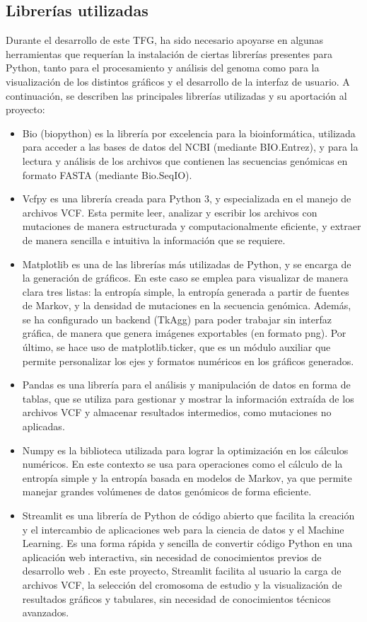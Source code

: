 \documentclass[11pt,spanish,listoffigures,listoftables]{tfgetsinf}
\begin{document}
\subsection{Librerías utilizadas}

Durante el desarrollo de este \acs{TFG}, ha sido necesario apoyarse en algunas herramientas que requerían la instalación de ciertas librerías presentes para Python, tanto para el procesamiento y análisis del genoma como para la visualización de los distintos gráficos y el desarrollo de la interfaz de usuario. A continuación, se describen las principales librerías utilizadas y su aportación al proyecto:

\begin{itemize}
   \item Bio (biopython) es la librería por excelencia para la bioinformática, utilizada para acceder a las bases de datos del \acs{NCBI} (mediante BIO.Entrez), y para la lectura y análisis de los archivos que contienen las secuencias genómicas en formato \acs{FASTA} (mediante Bio.SeqIO).
   \item Vcfpy es una librería creada para Python 3, y especializada en el manejo de archivos \acs{VCF}. Esta permite leer, analizar y escribir los archivos con mutaciones de manera estructurada y computacionalmente eficiente, y extraer de manera sencilla e intuitiva la información que se requiere.
   \item Matplotlib es una de las librerías más utilizadas de Python, y se encarga de la generación de gráficos. En este caso se emplea para visualizar de manera clara tres listas: la entropía simple, la entropía generada a partir de fuentes de Markov, y la densidad de mutaciones en la secuencia genómica. Además, se ha configurado un backend (TkAgg) para poder trabajar sin interfaz gráfica, de manera que genera imágenes exportables (en formato png). Por último, se hace uso de matplotlib.ticker, que es un módulo auxiliar que permite personalizar los ejes y formatos numéricos en los gráficos generados.
   \item Pandas es una librería para el análisis y manipulación de datos en forma de tablas, que se utiliza para gestionar y mostrar la información extraída de los archivos \acs{VCF} y almacenar resultados intermedios, como mutaciones no aplicadas.
   \item Numpy es la biblioteca utilizada para lograr la optimización en los cálculos numéricos. En este contexto se usa para operaciones como el cálculo de la entropía simple y la entropía basada en modelos de Markov, ya que permite manejar grandes volúmenes de datos genómicos de forma eficiente.
   \item Streamlit es una librería de Python de código abierto que facilita la creación y el intercambio de aplicaciones web para la ciencia de datos y el Machine Learning. Es una forma rápida y sencilla de convertir código Python en una aplicación web interactiva, sin necesidad de conocimientos previos de desarrollo web . En este proyecto, Streamlit facilita al usuario la carga de archivos \acs{VCF}, la selección del cromosoma de estudio y la visualización de resultados gráficos y tabulares, sin necesidad de conocimientos técnicos avanzados.
\end{itemize}
\end{document}
